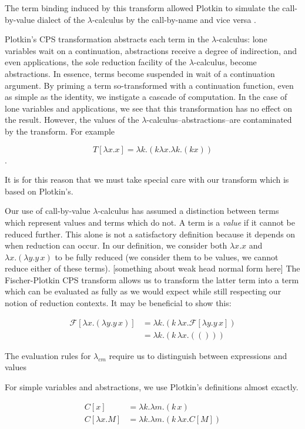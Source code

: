 \documentclass[ms,electronic,twosidetoc,letterpaper,chaptercenter,parttop]{byumsphd}
\begin{document}
The term binding induced by this transform allowed Plotkin to simulate the call-by-value
dialect of the $\lambda$-calculus by the call-by-name and vice versa
\cite{plotkin1975call}.



Plotkin's CPS transformation abstracts each term in the $\lambda$-calculus: lone variables
wait on a continuation, abstractions receive a degree of indirection, and even
applications, the sole reduction facility of the $\lambda$-calculus, become abstractions.
In essence, terms become suspended in wait of a continuation argument. By priming a term
so-transformed with a continuation function, even as simple as the identity, we instigate
a cascade of computation. In the case of lone variables and applications, we see that this
transformation has no effect on the result. However, the values of the
$\lambda$-calculus--abstractions--are contaminated by the transform. For example

\[
T[\lambda x.x]=\lambda k.(k \lambda x.\lambda k.(k x))
\].

It is for this reason that we must take special care with our transform which is based on Plotkin's.

Our use of call-by-value $\lambda$-calculus has assumed a distinction between terms which
represent values and terms which do not. A term is a \emph{value} if it cannot be reduced
further. This alone is not a satisfactory definition because it depends on when reduction
can occur. In our definition, we consider both $\lambda x.x$ and $\lambda
x.(\lambda y.y\,x)$ to be fully reduced (we consider them to be values, we cannot reduce
either of these terms). [something about weak head normal form here] The Fischer-Plotkin 
CPS transform allows us to transform the latter term into a term which can be evaluated as 
fully as we would expect while still respecting our notion of reduction contexts. It may 
be beneficial to show this:

\begin{align*}
\mathcal{F}[\lambda x.(\lambda y.y\,x)] &= \lambda k.(k\,\lambda x.\mathcal{F}[\lambda y.y\, x])\\
&= \lambda k.(k\, \lambda x.(()))
\end{align*}

The evaluation rules for $\lambda_{cm}$ require us to distinguish between expressions and values

For simple variables and abstractions, we use Plotkin's definitions almost exactly.

\begin{align*}
C[x]    &= \lambda k.\lambda m.(k\,x)\\
C[\lambda x.M] &= \lambda k.\lambda m.(k\,\lambda x.C[M])
\end{align*}
\end{document}
